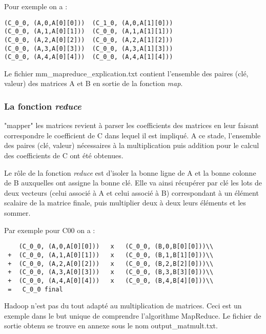 \par Pour exemple on a :
\begin{verbatim}
(C_0_0, (A,0,A[0][0]))  (C_1_0, (A,0,A[1][0]))
(C_0_0, (A,1,A[0][1]))	(C_0_0, (A,1,A[1][1]))
(C_0_0, (A,2,A[0][2]))	(C_0_0, (A,2,A[1][2]))
(C_0_0, (A,3,A[0][3]))	(C_0_0, (A,3,A[1][3]))
(C_0_0, (A,4,A[0][4]))	(C_0_0, (A,4,A[1][4]))
\end{verbatim}

\par Le fichier mm\_mapreduce\_explication.txt contient l'ensemble des paires (clé, valeur) des matrices A et B en sortie de la fonction \textit{map}.

\subsubsection{La fonction \textit{reduce}}

\par "mapper" les matrices revient à parser les coefficients des matrices en leur faisant correspondre le coefficient de C dans lequel il est impliqué. A ce stade, l'ensemble des paires (clé, valeur) nécessaires à la multiplication puis addition pour le calcul des coefficients de C ont été obtenues.

\par Le rôle de la fonction \textit{reduce} est d'isoler la bonne ligne de A et la bonne colonne de B auxquelles ont assigne la bonne clé. Elle va ainsi récupérer par clé les lots de deux vecteurs (celui associé à A et celui associé à B) correspondant à un élément scalaire de la matrice finale, puis multiplier deux à deux leurs éléments et les sommer.

\par Par exemple pour C00 on a :

\begin{verbatim}
    (C_0_0, (A,0,A[0][0]))   x   (C_0_0, (B,0,B[0][0]))\\
 +  (C_0_0, (A,1,A[0][1]))   x   (C_0_0, (B,1,B[1][0]))\\
 +  (C_0_0, (A,2,A[0][2]))   x   (C_0_0, (B,2,B[2][0]))\\
 +  (C_0_0, (A,3,A[0][3]))   x   (C_0_0, (B,3,B[3][0]))\\
 +  (C_0_0, (A,4,A[0][4]))   x   (C_0_0, (B,4,B[4][0]))\\
 =	 C_0_0 final
\end{verbatim}

\par Hadoop n'est pas du tout adapté au multiplication de matrices. Ceci est un exemple dans le but unique de comprendre l'algorithme MapReduce. Le fichier de sortie obtenu se trouve en annexe sous le nom output\_matmult.txt.

